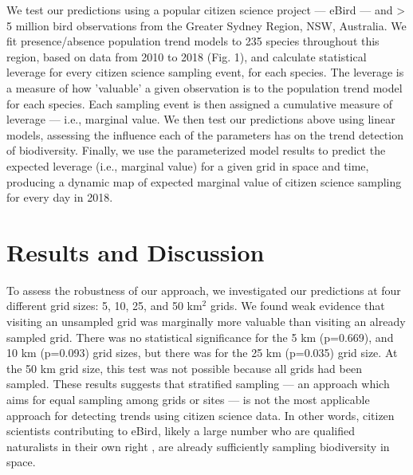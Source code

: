 \documentclass[9pt,twocolumn,twoside,lineno]{pnas-new}
\begin{document}
We test our predictions using a popular citizen science project --- eBird \cite{sullivan2009ebird} --- and > 5 million bird observations from the Greater Sydney Region, NSW, Australia. We fit presence/absence population trend models to 235 species throughout this region, based on data from 2010 to 2018 (Fig. 1), and calculate statistical leverage for every citizen science sampling event, for each species. The leverage is a measure of how 'valuable' a given observation is to the population trend model for each species. Each sampling event is then assigned a cumulative measure of leverage --- i.e., marginal value. We then test our predictions above using linear models, assessing the influence each of the parameters has on the trend detection of biodiversity. Finally, we use the parameterized model results to predict the expected leverage (i.e., marginal value) for a given grid in space and time, producing a dynamic map of expected marginal value of citizen science sampling for every day in 2018.

\section*{Results and Discussion}
To assess the robustness of our approach, we investigated our predictions at four different grid sizes: 5, 10, 25, and 50 km$^{2}$ grids. We found weak evidence that visiting an unsampled grid was marginally more valuable than visiting an already sampled grid. There was no statistical significance for the 5 km (p=0.669), and 10 km (p=0.093) grid sizes, but there was for the 25 km (p=0.035) grid size. At the 50 km grid size, this test was not possible because all grids had been sampled. These results suggests that stratified sampling --- an approach which aims for equal sampling among grids or sites --- \cite{baillie2008toward, longino1997biodiversity} is not the most applicable approach for detecting trends using citizen science data. In other words, citizen scientists contributing to eBird, likely a large number who are qualified naturalists in their own right \cite{callaghan2018unnatural}, are already sufficiently sampling biodiversity in space.
\end{document}
